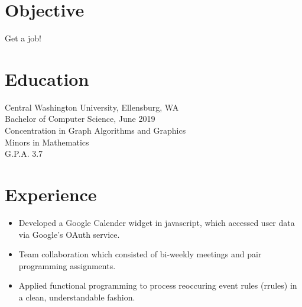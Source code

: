 \documentclass[11pt, a4paper]{article}
\begin{document}

\section*{Objective}
\vspace{-0.05in}
\hspace*{0.1in}
\begin{minipage}{.8\textwidth}
  Get a job!
\end{minipage}
\vspace{-0.15in}

\section*{Education}
\vspace{-0.05in}
\hspace*{0.1in}
\begin{minipage}{.8\textwidth}
  Central Washington University, Ellensburg, WA \\
  Bachelor of Computer Science, June 2019 \\
  Concentration in Graph Algorithms and Graphics \\
  Minors in Mathematics \\
  G.P.A. 3.7
\end{minipage}
\vspace{-0.1in}

\section*{Experience}

\noindent
{
  \hfill
  \hfill
}
\vspace{-0.1in}
\begin{itemize}
  \item Developed a Google Calender widget in javascript, which accessed user data via Google's OAuth service.
        \vspace{-0.1in}
  \item Team collaboration which consisted of bi-weekly meetings and pair programming assignments.
        \vspace{-0.1in}
  \item Applied functional programming to process reoccuring event rules (rrules) in a clean, understandable fashion.
\end{itemize}
\vspace{-0.05in}
\end{document}
